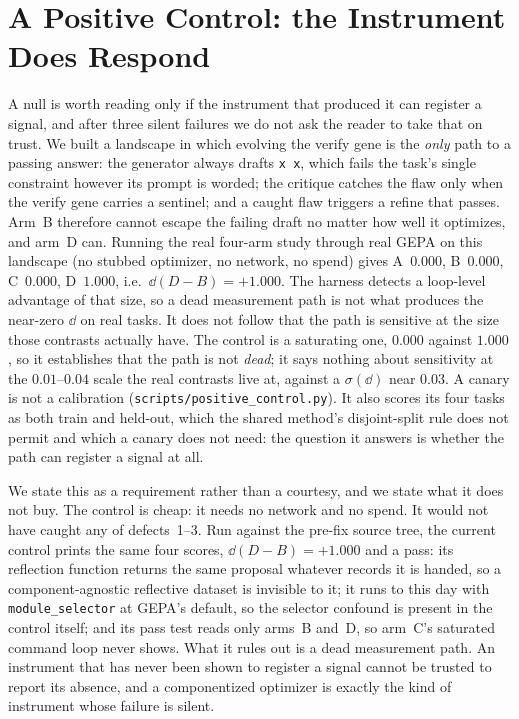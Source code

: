 \documentclass[11pt]{article}
\begin{document}
\section{A Positive Control: the Instrument Does Respond}
\label{sec:posctrl}

A null is worth reading only if the instrument that produced it can register a signal, and
after three silent failures we do not ask the reader to take that on trust. We built a
landscape in which evolving the verify gene is the \emph{only} path to a passing answer: the
generator always drafts \texttt{x\,x}, which fails the task's single constraint however its
prompt is worded; the critique catches the flaw only when the verify gene carries a sentinel;
and a caught flaw triggers a refine that passes. Arm~B therefore cannot escape the failing
draft no matter how well it optimizes, and arm~D can. Running the real four-arm study through
real GEPA on this landscape (no stubbed optimizer, no network, no spend) gives
A~$0.000$, B~$0.000$, C~$0.000$, D~$\mathbf{1.000}$, i.e.\ $\dd(D-B) = +1.000$. The harness
detects a loop-level advantage of that size, so a dead measurement path is not what produces the
near-zero $\dd$ on real tasks. It does not follow that the path is sensitive at the size those
contrasts actually have. The control is a
saturating one, $0.000$ against $1.000$, so it establishes that the path is not \emph{dead}; it
says nothing about sensitivity at the $0.01$--$0.04$ scale the real contrasts live at, against a
$\sigma(\dd)$ near $0.03$. A canary is not a calibration
(\texttt{scripts/positive\_control.py}). It also scores its four tasks as both train and
held-out, which the shared method's disjoint-split rule does not permit and which a canary does
not need: the question it answers is whether the path can register a signal at all.

We state this as a requirement rather than a courtesy, and we state what it does not buy. The
control is cheap: it needs no network and no spend. It would not have caught any of defects~1--3.
Run against the pre-fix source tree, the current control prints the same four scores, $\dd(D-B) =
+1.000$ and a pass: its reflection function returns the same proposal whatever records it is
handed, so a component-agnostic reflective dataset is invisible to it; it runs to this day with
\texttt{module\_selector} at GEPA's default, so the selector confound is present in the control
itself; and its pass test reads only arms~B and~D, so arm~C's saturated command loop never shows.
What it rules out is a dead measurement path. An instrument that has never been shown to register a signal
cannot be trusted to report its absence, and a componentized optimizer is exactly the kind of
instrument whose failure is silent.
\end{document}
